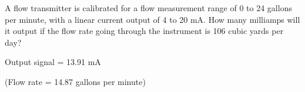 

A flow transmitter is calibrated for a flow measurement range of 0 to 24 gallons per minute, with a linear current output of 4 to 20 mA.  How many milliamps will it output if the flow rate going through the instrument is 106 cubic yards per day?







Output signal = 13.91 mA

\vskip 10pt

(Flow rate = 14.87 gallons per minute)
 










